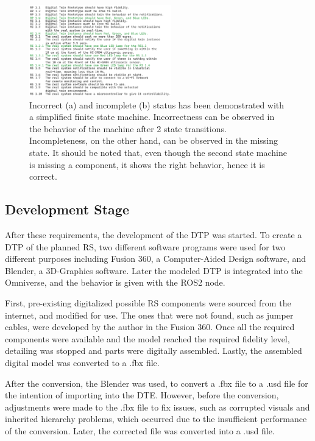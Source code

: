 \documentclass[conference]{IEEEtran}
\begin{document}
    \begin{figure}[htbp]
        \centering
        \includegraphics[width=0.55\textwidth]{Requirements.png}
        \caption{Incorrect (a) and incomplete (b) status has been demonstrated with a simplified finite state machine. Incorrectness can be observed in the behavior 
        of the machine after 2 state transitions. Incompleteness, on the other hand, can be observed in the missing state. It should be noted that, even though the second state machine is missing a 
        component, it shows the right behavior, hence it is correct.}\label{fig:Requirements}
    \end{figure}

    \subsection{Development Stage}
    After these requirements, the development of the DTP was started. To create a DTP of the planned RS, two different software programs were used for two different purposes including Fusion 360, 
    a Computer-Aided Design software, and Blender, a 3D-Graphics software. Later the modeled DTP is integrated into the Omniverse, and the behavior is given with the ROS2 node.

    First, pre-existing digitalized possible RS components were sourced from the internet, and modified for use. The ones that were not found, such as jumper cables, were developed by the author 
    in the Fusion 360. Once all the required components were available and the model reached the required fidelity level, detailing was stopped and parts were digitally assembled. 
    Lastly, the assembled digital model was converted to a .fbx file.

    After the conversion, the Blender was used, to convert a .fbx file to a .usd file for the intention of importing into the DTE. However, before the conversion, 
    adjustments were made to the .fbx file to fix issues, such as corrupted visuals and inherited hierarchy problems, which occurred due to the insufficient performance of the conversion. 
    Later, the corrected file was converted into a .usd file. 
\end{document}

